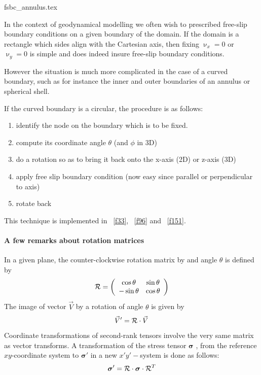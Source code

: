 \begin{flushright} {\tiny {\color{gray} fsbc\_annulus.tex}} \end{flushright}

In the context of geodynamical modelling we often wish to prescribed free-slip 
boundary conditions on a given boundary of the domain. If the domain is a rectangle
which sides align with the Cartesian axis, then fixing $\upnu_x=0$ or $\upnu_y=0$
is simple and does indeed insure free-slip boundary conditions. 

However the situation is much more complicated in the case of a curved boundary, 
such as for instance the inner and outer boundaries of an annulus or spherical shell.

If the curved boundary is a circular, the procedure is as follows:
\begin{enumerate}
\item identify the node on the boundary which is to be fixed. 
\item compute its coordinate angle $\theta$ (and $\phi$ in 3D) 
\item do a rotation so as to bring it back onto the x-axis (2D) or z-axis (3D)
\item apply free slip boundary condition (now easy since parallel or perpendicular to axis)
\item rotate back
\end{enumerate}

This technique is implemented in \stone~\ref{f33}, \stone~\ref{f96} and \stone~\ref{f151}.

\paragraph{A few remarks about rotation matrices} 
In a given plane, the counter-clockwise rotation matrix by and angle $\theta$ is defined by 
\[
{\cal R}=
\left(
\begin{array}{cc}
\cos\theta & \sin\theta \\
-\sin\theta & \cos\theta
\end{array}
\right)
\]
The image of vector $\vec{V}$ by a rotation of angle $\theta$ is given by
\[
\vec{V}'={\cal R}\cdot \vec{V}
\]

Coordinate transformations of second-rank tensors involve the very same   
matrix as vector transforms. A transformation of the stress tensor ${\bm \sigma}$ ,
from the reference $xy$-coordinate system to ${\bm \sigma}'$ in a new $x'y'-$system is done as follows:
\[
{\bm \sigma}'={\cal R}\cdot {\bm \sigma}\cdot{\cal R}^T
\]



